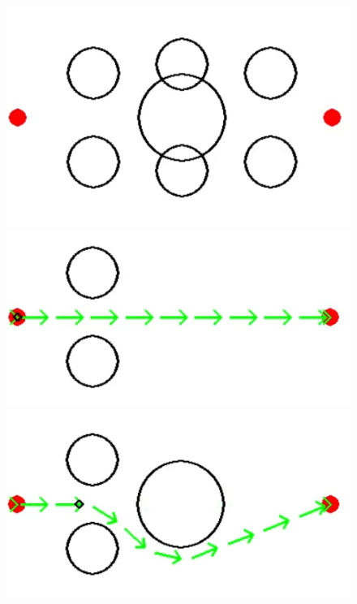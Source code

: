 \begin{figure}[!htb]
    \centering
    \begin{minipage}[b]{.3\linewidth}
        \centering
        \includegraphics[width=0.9\linewidth]{Figures/07_simulation/lidar/lidar1.png}
    \end{minipage}%
    \hfill%
    \begin{minipage}[b]{.3\linewidth}
        \centering
        \includegraphics[width=0.9\linewidth]{Figures/07_simulation/lidar/lidar2.png}
    \end{minipage}%
    \hfill%
    \begin{minipage}[b]{.3\linewidth}
        \centering
        \includegraphics[width=0.9\linewidth]{Figures/07_simulation/lidar/lidar3.png}

\end{minipage}
\end{figure}

